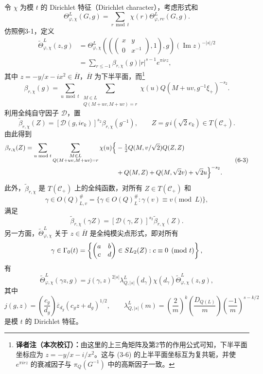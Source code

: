 令 $\chi$ 为模 $t$ 的 Dirichlet 特征（Dirichlet character），考虑形式和
\[
 \Theta_{\varphi,\chi}^L(G,g)=\sum_{r\bmod t}\chi(r)\Theta_{\varphi,rv}^L(G,g).
\]
仿照例3-1，定义
\begin{equation}
\begin{split}
 \widetilde\Theta_{\varphi,\chi}^L(z,g)
 &=\Theta_{\varphi,\chi}^L\!\left(\left(\begin{pmatrix}x&y\\0&x^{-1}\end{pmatrix},1\right),g\right)
 (\operatorname{Im}z)^{-|s|/2}\\
 &=\sum_{r\le-1}\beta_{r,\chi}(g)|r|^{s-1}e^{\pi irz},
\end{split}\tag{6-2}
\end{equation}
其中 $z=-y/x-ix^2\in\overline H$，$\overline H$ 为下半平面，而\footnote{\textbf{译者注（本次校订）：}由这里的上三角矩阵及第2节的作用公式可知，下半平面坐标应为 $z=-y/x-i/x^2$。这与 (3-6) 的上半平面坐标互为复共轭，并使 $e^{\pi irz}$ 的衰减因子与 $\pi_Q(G^{-1})$ 中的高斯因子一致。}
\[
 \beta_{r,\chi}(g)=\sum_{u\bmod t}\sum_{\substack{M\in L\\Q(M+uv,M+uv)=r}}
 \chi(u)Q(M+uv,g^{-1}\xi_+)^{-s_2}.
\]
利用全纯自守因子 $\mathcal D$，置
\[
 \widetilde\beta_{r,\chi}(Z)=[\mathcal D(g,ie_k)]^{s_2}\beta_{r,\chi}(g^{-1}),
 \qquad Z=g\,i(\sqrt2e_k)\in T(\mathcal C_+).
\]
由此得到
\begin{equation}
\begin{split}
 \widetilde\beta_{r,\chi}(Z)
 =\sum_{u\bmod t}\sum_{\substack{M\in L\\Q(M+uv,M+uv)=r}}\chi(u)
 \Bigl\{&-\tfrac12Q(M,v/\sqrt2)Q(Z,Z)\\
 &+Q(M,Z)+Q(M,\sqrt2\widetilde v)+\sqrt2u\Bigr\}^{-s_2}.
\end{split}\tag{6-3}
\end{equation}
此外，$\widetilde\beta_{r,\chi}$ 是 $T(\mathcal C_+)$ 上的全纯函数，对所有 $Z\in T(\mathcal C_+)$ 和
\[
 \gamma\in O(Q)_{L,v}^\#=\{\gamma\in O(Q)_L^\#:\gamma(v)\equiv v\pmod L\},
\]
满足
\[
 \widetilde\beta_{r,\chi}(\gamma Z)
 =[\mathcal D(\gamma,Z)]^{s_2}\widetilde\beta_{r,\chi}(Z).
\]
另一方面，$\widetilde\Theta_{\varphi,\chi}^L$ 关于 $z\in\overline H$ 是全纯模尖点形式，即对所有
\[
 \gamma\in\Gamma_0(t)=\left\{\begin{pmatrix}a&b\\c&d\end{pmatrix}\in\operatorname{SL}_2(\Z):c\equiv0\pmod t\right\},
\]
有
\[
 \widetilde\Theta_{\varphi,\chi}^L(\gamma z,g)
 =j(\gamma,z)^{2|s|}\lambda_{Q,|s|}^L(d_\gamma)\chi(d_\gamma)
 \widetilde\Theta_{\varphi,\chi}^L(z,g),
\]
其中
\[
 j(g,z)=\left(\frac{c_g}{d_g}\right)\overline\varepsilon_{d_g}(c_gz+d_g)^{1/2},
 \qquad
 \lambda_{Q,|s|}^L(m)=\left(\frac2m\right)^k
 \left(\frac{D_{Q(L)}}m\right)\left(\frac{-1}m\right)^{s-k/2}
\]
是模 $t$ 的 Dirichlet 特征。

